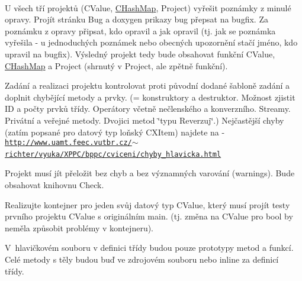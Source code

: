 ~\newline

\begin{DoxyEnumerate}
\item U všech tří projektů (C\+Value, \hyperlink{class_c_hash_map}{C\+Hash\+Map}, Project) vyřešit poznámky z minulé opravy. Projít stránku Bug a doxygen prikazy bug přepsat na bugfix. Za poznámku z opravy připsat, kdo opravil a jak opravil (tj. jak se poznámka vyřešila -\/ u jednoduchých poznámek nebo obecných upozornění stačí jméno, kdo upravil na bugfix). Výsledný projekt tedy bude obsahovat funkční C\+Value, \hyperlink{class_c_hash_map}{C\+Hash\+Map} a Project (shrnutý v Project, ale zpětně funkční).~\newline
~\newline

\item Zadání a realizaci projektu kontrolovat proti původní dodané šabloně zadání a doplnit chybějící metody a prvky. (= konstruktory a destruktor. Možnost zjistit ID a počty prvků třídy. Operátory včetně nečlenského a konverzního. Streamy. Privátní a veřejné metody. Dvojici metod \char`\"{}typu Reverzuj\char`\"{}.) Nejčastější chyby (zatím popsané pro datový typ loňský C\+X\+Item) najdete na -\/ \href{http://www.uamt.feec.vutbr.cz/%7Erichter/vyuka/XPPC/bppc/cviceni/chyby_hlavicka.html}{\tt http\+://www.\+uamt.\+feec.\+vutbr.\+cz/$\sim$richter/vyuka/\+X\+P\+P\+C/bppc/cviceni/chyby\+\_\+hlavicka.\+html}~\newline
~\newline

\item Projekt musí jít přeložit bez chyb a bez významných varování (warnings). Bude obsahovat knihovnu Check.~\newline
~\newline

\item Realizujte kontejner pro jeden svůj datový typ C\+Value, který musí projít testy prvního projektu C\+Value s originálním main. (tj. změna na C\+Value pro bool by neměla způsobit problémy v kontejneru).~\newline
~\newline

\item V hlavičkovém souboru v definici třídy budou pouze prototypy metod a funkcí. Celé metody s těly budou buď ve zdrojovém souboru nebo inline za definicí třídy.~\newline
~\newline


\end{DoxyEnumerate}
